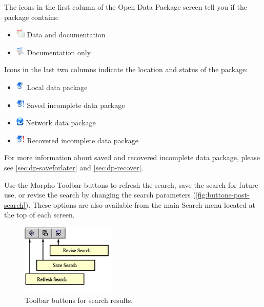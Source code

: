 The icons in the first column of the Open Data Package screen tell you
if the package contains:
\begin{itemize}
  \parskip 3pt
  \itemsep 0pt
  \item[] \includegraphics[scale=0.7]{images/indicator-hasdata.png}
    Data and documentation
  \item[] \includegraphics[scale=0.7]{images/indicator-hasnodata.png}
	Documentation only 
\end{itemize}

Icons in the last two columns indicate the location and status of the
package:
\begin{itemize}
  \parskip 3pt
  \itemsep 0pt
  \item[] \includegraphics[scale=0.7]{images/indicator-dp-local.png}
  Local data package
  \item[] \includegraphics[scale=0.7]{images/indicator-dp-incomplete.png}
  Saved incomplete data package
  \item[] \includegraphics[scale=0.7]{images/indicator-dp-network.png}
  Network data package
  \item[] \includegraphics[scale=0.7]{images/indicator-dp-recovered.png}
  Recovered incomplete data package
\end{itemize}

For more information about saved and recovered incomplete data package,
please see \autoref{sec:dp-saveforlater} and
\autoref{sec:dp-recover}.

Use the Morpho Toolbar buttons to refresh the search, save the search
for future use, or revise the search by changing the search parameters
(\autoref{fig:buttons-post-search}). These options are also available
from the main Search menu located at the top of each screen.

\begin{figure}
  \centering
    \includegraphics[width=0.4\textwidth]{images/buttons-post-search.jpg}
  \caption{Toolbar buttons for search results.}
  \label{fig:buttons-post-search}
\end{figure}


